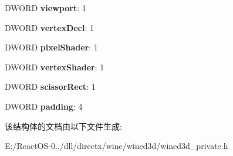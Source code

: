 \begin{DoxyCompactItemize}
D\+W\+O\+RD {\bfseries viewport}\+: 1
\item 
\mbox{\label{structwined3d__saved__states_a46ab6e0ec6814d766be5ca3511682c72}} 
D\+W\+O\+RD {\bfseries vertex\+Decl}\+: 1
\item 
\mbox{\label{structwined3d__saved__states_aba0b12b23df934faa42c7e0980230b6a}} 
D\+W\+O\+RD {\bfseries pixel\+Shader}\+: 1
\item 
\mbox{\label{structwined3d__saved__states_a0c46b0344221963992a6e6c627d93ae5}} 
D\+W\+O\+RD {\bfseries vertex\+Shader}\+: 1
\item 
\mbox{\label{structwined3d__saved__states_a41b672fcdfabb8a63afdaae67d445674}} 
D\+W\+O\+RD {\bfseries scissor\+Rect}\+: 1
\item 
\mbox{\label{structwined3d__saved__states_aecc5d7b48d06e08c7c45f6134ef67cbb}} 
D\+W\+O\+RD {\bfseries padding}\+: 4
\end{DoxyCompactItemize}


该结构体的文档由以下文件生成\+:\begin{DoxyCompactItemize}
\item 
E\+:/\+React\+O\+S-\/0../dll/directx/wine/wined3d/wined3d\+\_\+private.\+h\end{DoxyCompactItemize}

